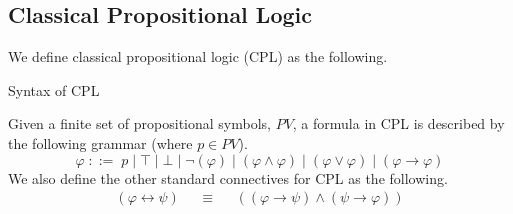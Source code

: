 \documentclass{llncs}
\begin{document}
\subsection{Classical Propositional Logic}
%
We define classical propositional logic (CPL) as the following.
%
\begin{definition}{Syntax of CPL}\label{Syntax of CPL}

Given a finite set of propositional symbols, $PV$, a formula in CPL is
described by the following grammar (where $p \in PV$).
%
\begin{equation*}
\varphi \; ::= \; p \; \vert \; \top \; \vert \; \bot \; \vert \; \neg
(\varphi) \; \vert \; (\varphi \wedge \varphi) \; \vert \; (\varphi \vee
\varphi) \; \vert \; (\varphi \rightarrow \varphi)
\end{equation*}
%
We also define the other standard connectives for CPL as the following.
%
$$
\begin{array}{rlcll}
(\varphi \leftrightarrow \psi) &&\equiv&& ((\varphi \rightarrow \psi) \wedge
(\psi \rightarrow \varphi)) \\
\end{array}
$$
%
\end{definition}
\end{document}
